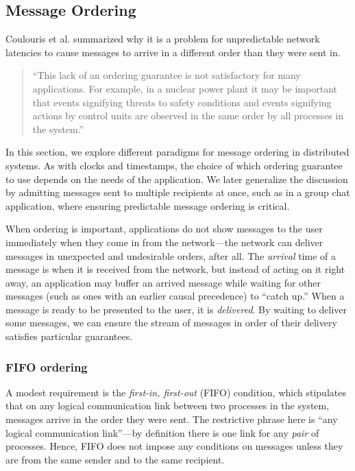 \documentclass[]             %
{NASA}                       %
\theoremstyle{definition}
\begin{document}
\subsection{Message Ordering}
\label{ssec:message-ordering}
Coulouris et al. \cite{coulouris2005distributed} summarized why
it is a problem for unpredictable network latencies to cause messages
to arrive in a different order than they were sent in.
\begin{quote}
  ``This lack of an ordering guarantee is not satisfactory for many
  applications. For example, in a nuclear power plant it may be
  important that events signifying threats to safety conditions and
  events signifying actions by control units are observed in the same
  order by all processes in the system.''
\end{quote}
In this section, we explore different paradigms for message ordering
in distributed systems. As with clocks and timestamps, the choice of
which ordering guarantee to use depends on the needs of the
application. We later generalize the discussion by admitting messages
sent to multiple recipients at once, such as in a group chat
application, where ensuring predictable message ordering is critical.

When ordering is important, applications do not show messages to the
user immediately when they come in from the network---the network can
deliver messages in unexpected and undesirable orders, after all. The
\emph{arrival} time of a message is when it is received from the
network, but instead of acting on it right away, an application may
buffer an arrived message while waiting for other messages (such as
ones with an earlier causal precedence) to ``catch up.'' When a
message is ready to be presented to the user, it is
\emph{delivered}. By waiting to deliver some messages, we can ensure
the stream of messages in order of their delivery satisfies particular
guarantees.

\subsubsection{FIFO ordering}
A modest requirement is the \emph{first-in, first-out} (FIFO)
condition, which stipulates that on any logical communication link
between two processes in the system, messages arrive in the order they
were sent. The restrictive phrase here is ``any logical communication
link''---by definition there is one link for any \emph{pair} of
processes. Hence, FIFO does not impose any conditions on messages
unless they are from the same sender and to the same recipient.
\end{document}

